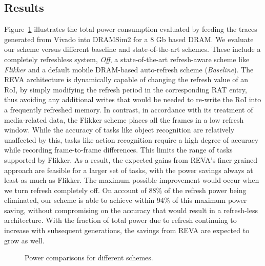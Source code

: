 \subsection{Results}
Figure~\ref{fig:PowerResults} illustrates the total power consumption evaluated by feeding the traces generated from Vivado into DRAMSim2 for a 8 Gb based DRAM. We evaluate our scheme versus different baseline and state-of-the-art schemes. These include a completely refreshless system, \emph{Off}, a state-of-the-art refresh-aware scheme like \emph{Flikker} and a default mobile DRAM-based auto-refresh scheme (\emph{Baseline}). %
The REVA architecture is dynamically capable of changing the refresh value of an RoI, by simply modifying the refresh period in the corresponding RAT entry, thus avoiding any additional writes that would be needed to re-write the RoI into a frequently refreshed memory. In contrast, in accordance with its treatment of media-related data, the Flikker scheme places all the frames in a low refresh window. While the accuracy of tasks like object recognition are relatively unaffected by this, tasks like action recognition require a high degree of accuracy while recording frame-to-frame differences. 
This limits the range of tasks supported by Flikker. As a result, the expected gains from REVA's finer grained approach are feasible for a larger set of tasks, with the power savings always at least as much as Flikker.
The maximum possible improvement would occur when we turn refresh completely off. On account of 88\% of the refresh power being eliminated, our scheme is able to achieve within 94\% of this maximum power saving, without compromising on the accuracy that would result in a refresh-less architecture. With the fraction of total power due to refresh continuing to increase with subsequent generations, the savings from REVA are expected to grow as well.

\begin{figure}[ht!]
\centering
{}
\caption{\label{fig:PowerResults} Power comparisons for different schemes.}
\vspace{-0.2in}
\end{figure}

